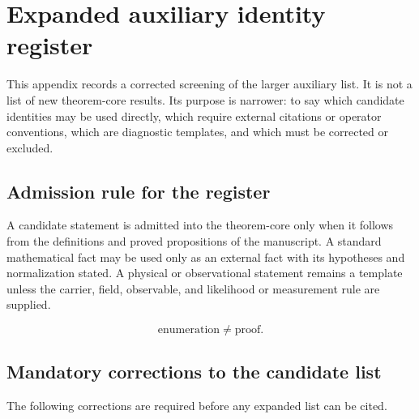 \documentclass[11pt,a4paper]{article}
\begin{document}
\section{Expanded auxiliary identity register}
\label{app:expanded-auxiliary-register}

This appendix records a corrected screening of the larger auxiliary list.  It is not a list of new theorem-core results.  Its purpose is narrower: to say which candidate identities may be used directly, which require external citations or operator conventions, which are diagnostic templates, and which must be corrected or excluded.

\subsection{Admission rule for the register}

A candidate statement is admitted into the theorem-core only when it follows from the definitions and proved propositions of the manuscript.  A standard mathematical fact may be used only as an external fact with its hypotheses and normalization stated.  A physical or observational statement remains a template unless the carrier, field, observable, and likelihood or measurement rule are supplied.

\[
\text{enumeration}\ne\text{proof}.
\]

\subsection{Mandatory corrections to the candidate list}

The following corrections are required before any expanded list can be cited.
\end{document}
